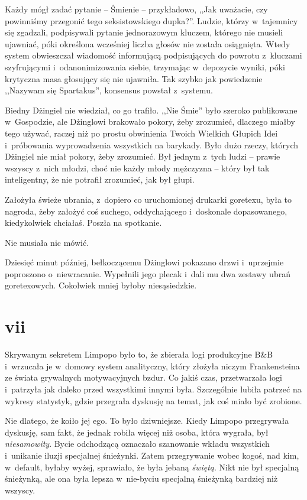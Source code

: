 \documentclass[oneside,polish,11pt,sfheadings]{mwbk}
\begin{document}
Każdy mógł zadać pytanie -- Śmienie -- przykładowo, ,,Jak uważacie, czy
powinniśmy przegonić tego seksistowskiego dupka?''. Ludzie, którzy w~tajemnicy się zgadzali, podpisywali pytanie jednorazowym kluczem,
którego nie musieli ujawniać, póki określona wcześniej liczba głosów nie
została osiągnięta. Wtedy system obwieszczał wiadomość informującą
podpisujących do powrotu z~kluczami szyfrującymi i~odanonimizowania
siebie, trzymając w~depozycie wyniki, póki krytyczna masa głosujący się
nie ujawniła. Tak szybko jak powiedzenie ,,Nazywam się Spartakus'',
konsensus powstał z~systemu.

Biedny Dżingiel nie wiedział, co go trafiło. ,,Nie Śmie'' było szeroko
publikowane w~Gospodzie, ale Dżinglowi brakowało pokory, żeby zrozumieć,
dlaczego miałby tego używać, raczej niż po prostu obwinienia Twoich
Wielkich Głupich Idei i~próbowania wyprowadzenia wszystkich na barykady.
Było dużo rzeczy, których Dżingiel nie miał pokory, żeby zrozumieć. Był
jednym z~tych ludzi -- prawie wszyscy z~nich młodzi, choć nie każdy młody
mężczyzna -- który był tak inteligentny, że nie potrafił zrozumieć, jak
był głupi.

Założyła świeże ubrania, z~dopiero co uruchomionej drukarki goretexu,
była to nagroda, żeby założyć coś suchego, oddychającego i~doskonale
dopasowanego, kiedykolwiek chciałaś. Poszła na spotkanie.

Nie musiała nic mówić.

Dziesięć minut później, bełkoczącemu Dżinglowi pokazano drzwi i~uprzejmie poproszono o~niewracanie. Wypełnili jego plecak i~dali mu dwa
zestawy ubrań goretexowych. Cokolwiek mniej byłoby niesąsiedzkie.

\chapter*{vii}

Skrywanym sekretem Limpopo było to, że zbierała logi produkcyjne B\&B i~wrzucała je w~domowy system analityczny, który złożyła niczym
Frankensteina ze świata grywalnych motywacyjnych bzdur. Co jakiś czas,
przetwarzała logi i~patrzyła jak daleko przed wszystkimi innymi była.
Szczególnie lubiła patrzeć na wykresy statystyk, gdzie przegrała
dyskusję na temat, jak coś miało być zrobione.

Nie dlatego, że koiło jej ego. To było dziwniejsze. Kiedy Limpopo
przegrywała dyskusję, sam fakt, że jednak robiła więcej niż osoba, która
wygrała, był \textit{niesamowity}. Bycie odchodzącą oznaczało szanowanie
wkładu wszystkich i~unikanie iluzji specjalnej śnieżynki. Zatem
przegrywanie wobec kogoś, nad kim, w~default, byłaby wyżej, sprawiało,
że była jebaną \textit{świętą}. Nikt nie był specjalną śnieżynką, ale ona
była lepsza w~nie-byciu specjalną śnieżynką bardziej niż wszyscy.
\end{document}
